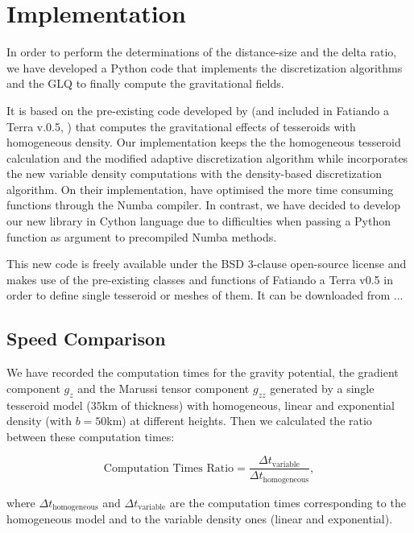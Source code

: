 \documentclass[extra]{gji}
\begin{document}
\section{Implementation}

In order to perform the determinations of the distance-size and the 
delta ratio, we have developed a Python code that implements the 
discretization algorithms and the GLQ to finally compute the 
gravitational fields.

It is based on the pre-existing code developed by \citet{Uieda2016} (and 
included in Fatiando a Terra v.0.5, \citet{Uieda2013}) that computes 
the gravitational effects of tesseroids with homogeneous density.
Our implementation keeps the the homogeneous tesseroid calculation and 
the modified adaptive discretization algorithm while incorporates the 
new variable density computations with the density-based discretization 
algorithm.
On their implementation, \citet{Uieda2016} have optimised the more time 
consuming functions through the Numba compiler.
In contrast, we have decided to develop our new library in Cython 
language due to difficulties when passing a Python function as argument 
to precompiled Numba methods.

This new code is freely available under the BSD 3-clause open-source 
license and makes use of the pre-existing classes and functions of 
Fatiando a Terra v0.5 in order to define single tesseroid or meshes of 
them.
It can be downloaded from ...


\subsection{Speed Comparison}

We have recorded the computation times for the gravity potential, the gradient component $g_z$ and the Marussi tensor component $g_{zz}$ generated by a single tesseroid model ($35$km of thickness) with homogeneous, linear and exponential density (with $b=50$km) at different heights. Then we calculated the ratio between these computation times:

\begin{equation}
    \text{Computation Times Ratio} =
        \frac{\Delta t_\text{variable}}{\Delta t_\text{homogeneous}},
    \label{eq:computation-times-ratio}
\end{equation}

\noindent where $\Delta t_\text{homogeneous}$ and $\Delta t_\text{variable}$ are the computation times corresponding to the homogeneous model and to the variable density ones (linear and exponential).
\end{document}
